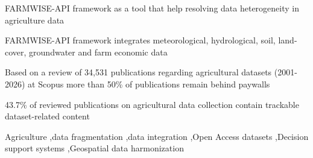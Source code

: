 \documentclass[preprint,12pt,authoryear]{elsarticle}
\begin{document}
\begin{frontmatter}
\begin{highlights}
\item FARMWISE-API framework as a tool that help resolving data heterogeneity in agriculture data 
\item FARMWISE-API framework integrates meteorological, hydrological, soil, land-cover, groundwater and farm economic data
\item Based on a review of 34,531 publications regarding agricultural datasets (2001-2026) at Scopus more than 50\% of publications remain behind paywalls
\item 43.7\% of reviewed publications on agricultural data collection contain trackable dataset-related content
\end{highlights}

\begin{keyword}
Agriculture \sep data fragmentation \sep data integration \sep Open Access datasets \sep Decision support systems \sep Geospatial data harmonization


\end{keyword}

\end{frontmatter}



\end{document}
